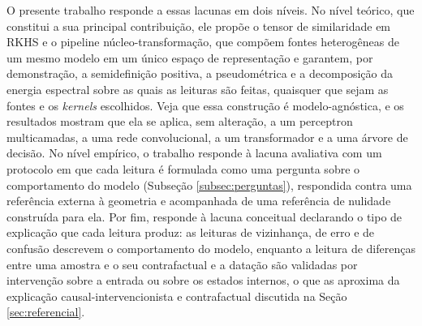 O presente trabalho responde a essas lacunas em dois níveis. No nível teórico, que constitui a sua principal contribuição, ele propõe o tensor de similaridade em RKHS e o pipeline núcleo-transformação, que compõem fontes heterogêneas de um mesmo modelo em um único espaço de representação e garantem, por demonstração, a semidefinição positiva, a pseudométrica e a decomposição da energia espectral sobre as quais as leituras são feitas, quaisquer que sejam as fontes e os \textit{kernels} escolhidos. Veja que essa construção é modelo-agnóstica, e os resultados mostram que ela se aplica, sem alteração, a um perceptron multicamadas, a uma rede convolucional, a um transformador e a uma árvore de decisão. No nível empírico, o trabalho responde à lacuna avaliativa com um protocolo em que cada leitura é formulada como uma pergunta sobre o comportamento do modelo (Subseção \ref{subsec:perguntas}), respondida contra uma referência externa à geometria e acompanhada de uma referência de nulidade construída para ela. Por fim, responde à lacuna conceitual declarando o tipo de explicação que cada leitura produz: as leituras de vizinhança, de erro e de confusão descrevem o comportamento do modelo, enquanto a leitura de diferenças entre uma amostra e o seu contrafactual e a datação são validadas por intervenção sobre a entrada ou sobre os estados internos, o que as aproxima da explicação causal-intervencionista e contrafactual discutida na Seção \ref{sec:referencial}.
